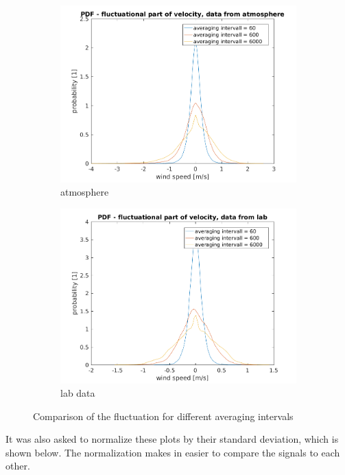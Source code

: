 \documentclass[12pt]{article}
\begin{document}
\begin{figure}[H]
\begin{subfigure}{0.5\textwidth}
  \centering
  \includegraphics[width=1\linewidth]{figures/pdf_interval_comparison_atmosphere.png}
  \caption{atmosphere}
\end{subfigure}
\begin{subfigure}{0.5\textwidth}
  \centering
  \includegraphics[width=1\linewidth]{figures/pdf_interval_comparison_labdata.png}
  \caption{lab data}
\end{subfigure}
\caption{Comparison of the fluctuation for different averaging intervals}
\label{fig:pdf_fluc}
\end{figure}

It was also asked to normalize these plots by their standard deviation, which is shown below. The normalization makes in easier to compare the signals to each other.
\end{document}
